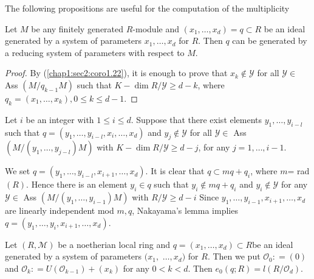 The following propositions are useful for the computation of the
multiplicity  

\setcounter{proposition}{23}
\begin{proposition}\label{chap1:sec2:prop1.24} %
  Let $M$ be any finitely generated $R$-module and $(x_1, \ldots,
  x_d) = q \subset R$ be an ideal generated by a system of parameters
  $x_1, \ldots, x_d$ for $R$. Then $q$ can be generated by a reducing
  system of parameters with respect to $M$. 
\end{proposition}

\begin{proof}
  By (\ref{chap1:sec2:coro1.22}), it is enough to prove that $x_k
  \notin \mathscr{Y}$ for 
  all $\mathscr{Y} \in $ Ass $(M/ q_{k-1}M)$ such that $K-\dim
  R/\mathscr{Y} \geq d-k$, where $q_k = (x_1, \ldots, x_k), 0 \leq k
  \leq d-1$.  
\end{proof}

Let $i$ be an integer with $1 \leq i \leq d$. Suppose that there exist
elements $y_1, \ldots, y_{i-l}$ such that $q=(y_1, \ldots, y_{i-l},
x_i, \ldots, x_d) $ and $y_j \notin \mathscr{Y}$ for all $\mathscr{Y}
\in $ Ass $(M/ (y_1, \ldots, y_{j-l})M)$ with $K- \dim R/\mathscr{Y}
\geq d-j$, for any $j= 1, \ldots, i - 1$.  

We set $q=(y_1, \ldots,  y_{i-l}, x_{i+1}, \ldots, x_d) $. It is clear
that $q \subset m q+ q_i$, where $m$= rad $(R)$. Hence there is an
element $y_i \in q$ such that $ y_i \notin m q+q_i$ and $ y_i \notin
\mathscr{Y}$ for any $\mathscr{Y} \in $ Ass $(M/ (y_1, \ldots,
y_{i-1})M)$ with $R/ \mathscr{Y} \geq d -i$ Since $y_1, \ldots,
y_{i-1}, x_{i+1}, \ldots,  x_d$ are linearly independent mod $m, q$,
Nakayama's lemma implies $q=(y_1, \ldots,  y_{i}, x_{i+1}, \ldots,
x_d)$.  

\begin{proposition}\label{chap1:sec2:prop1.25}
Let $(R, \mathscr{M})$ be a noetherian local ring and $q=
  (x_{1}, \ldots, x_d) \subset R$\pageoriginale be an ideal generated
by a system 
  of parameters $(x_{1},$ $\ldots, x_d) $ for $R$. Then we put
  $\mathscr{O}_0:  = (0)$ and $\mathscr{O}_k:  = U( \mathscr{O}_{k-1})+
  (x_k)$ for any $0 < k< d$. Then $e_0 (q;R) = l (R/
  \mathscr{O}_d)$. 
\end{proposition}

